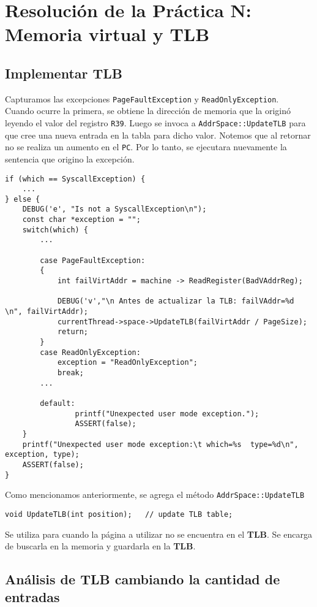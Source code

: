 \chapter{Resolución de la Práctica N: Memoria virtual y TLB}
\section{Implementar TLB}
Capturamos las excepciones \texttt{PageFaultException} y \texttt{ReadOnlyException}.\\
Cuando ocurre la primera, se obtiene la dirección de memoria que la originó leyendo el valor del registro \texttt{R39}. Luego se invoca a \texttt{AddrSpace::UpdateTLB} para que cree una nueva entrada en la tabla para dicho valor. Notemos que al retornar no se realiza un aumento en el \texttt{PC}. Por lo tanto, se ejecutara nuevamente la sentencia que origino la excepción.
\begin{lstlisting}[style=C]
if (which == SyscallException) {
	...
} else {
	DEBUG('e', "Is not a SyscallException\n");
    const char *exception = "";
    switch(which) {
    	...
    	
		case PageFaultException:
		{
	    	int failVirtAddr = machine -> ReadRegister(BadVAddrReg);

	        DEBUG('v',"\n Antes de actualizar la TLB: failVAddr=%d \n", failVirtAddr);
			currentThread->space->UpdateTLB(failVirtAddr / PageSize);
	        return;
		}
	    case ReadOnlyException: 
	    	exception = "ReadOnlyException";
    	    break;	    
    	...
    	
    	default:
                printf("Unexpected user mode exception.");
                ASSERT(false);
    }
    printf("Unexpected user mode exception:\t which=%s  type=%d\n", exception, type);
    ASSERT(false);
}
\end{lstlisting}
Como mencionamos anteriormente, se agrega el método \texttt{AddrSpace::UpdateTLB}
\begin{lstlisting}[style=C]
void UpdateTLB(int position);   // update TLB table;
\end{lstlisting}
Se utiliza para cuando la página a utilizar no se encuentra en el \textbf{TLB}. Se encarga de buscarla en la memoria y guardarla en la \textbf{TLB}.
\section{Análisis de TLB cambiando la cantidad de entradas}
